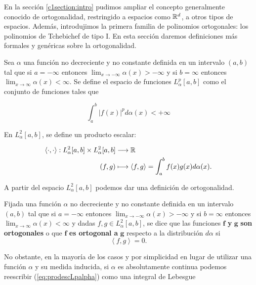 En la sección \ref{c1section:intro} pudimos ampliar el concepto generalmente conocido de ortogonalidad, restringido a espacios como $\mathbb{R}^d$, a otros tipos de espacios. Además, introdujimos la primera familia de polinomios ortogonales: los polinomios de Tchebichef de tipo I. En esta sección daremos definiciones más formales y genéricas sobre la ortogonalidad.

Sea $\alpha$ una función no decreciente y no constante definida en un intervalo $(a,b)$ tal que si $a=-\infty$ entonces $\lim_{x\rightarrow-\infty}\alpha(x)>-\infty$ y si $b=\infty$ entonces $\lim_{x\rightarrow\infty}\alpha(x)<\infty$. Se define el espacio de funciones $L_\alpha^p[a,b]$ como el conjunto de funciones tales que

$$
\int_a^b |f(x)|^p d\alpha(x) < +\infty
$$

En $L_\alpha^2[a,b]$, se define un producto escalar:

\begin{equation}
    \label{eq:prodescLpalpha}
    \begin{split}
        \left\langle\cdot,\cdot\right\rangle:L_\alpha^2[a,b]\times L_\alpha^2[a,b] &\longrightarrow \mathbb{R} \\
        (f,g)&\longmapsto \left\langle f,g \right\rangle=\int_a^b f(x)g(x)d\alpha(x).
    \end{split}
\end{equation}

A partir del espacio $L_\alpha^2[a,b]$ podemos dar una definición de ortogonalidad.

\begin{definicion}[Ortogonalidad]

    Fijada una función $\alpha$ no decreciente y no constante definida en un intervalo $(a,b)$ tal que si $a=-\infty$ entonces $\lim_{x\rightarrow-\infty}\alpha(x)>-\infty$ y si $b=\infty$ entonces $\lim_{x\rightarrow\infty}\alpha(x)<\infty$ y dadas $f,g\in L_\alpha^2[a,b]$, se dice que las funciones $\mathbf f$ \textbf y $\mathbf g$ \textbf{son ortogonales} o que $\mathbf f$ \textbf{es ortogonal a} $\mathbf{g}$ respecto a la distribución $d\alpha$ si
    $$
    \left\langle f,g\right\rangle = 0.
    $$
\end{definicion}

No obstante, en la mayoría de los casos y por simplicidad en lugar de utilizar una función $\alpha$ y su medida inducida, si $\alpha$ es absolutamente continua podemos reescribir (\ref{eq:prodescLpalpha}) como una integral de Lebesgue

